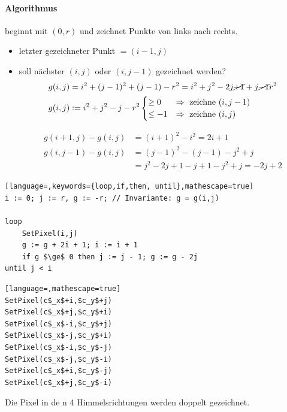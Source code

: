 \paragraph*{Algorithmus}
	beginnt mit $(0,r)$ und zeichnet Punkte von links nach rechts.
	\begin{itemize}
	 \item letzter gezeichneter Punkt $= (i-1,j)$
	 \item soll nächster $(i,j)$ oder $(i,j-1)$ gezeichnet werden?
		\begin{align*}
			g(i,j) &= i^2 + (j-1)^2 + (j-1) - r^2 = i^2 + j^2 - 2j \cancel{+ 1} + j \cancel{- 1} r^2\\
			g(i,j) &:= i^2 + j^2 - j - r^2 \begin{cases}
			                              \ge 0 &\Rightarrow\ \text{zeichne $(i, j-1)$}\\
			                              \le -1 & \Rightarrow\ \text{zeichne $(i, j)$}
			                             \end{cases}
		\end{align*}
		\begin{center}
		\end{center}
		\begin{align*}
		 g(i+1,j) - g(i,j) &= (i+1)^2 - i^2 = 2i + 1\\
		 g(i,j-1) - g(i,j) &= (j-1)^2 - (j-1) - j^2 + j\\
				   &= j^2 - 2j + 1 - j + 1 - j^2 + j = -2j + 2
		\end{align*}
		\begin{center}
		\end{center}
	\end{itemize}
	\begin{lstlisting}[language=,keywords={loop,if,then, until},mathescape=true]
i := 0; j := r, g := -r; // Invariante: g = g(i,j)

loop
	SetPixel(i,j)
	g := g + 2i + 1; i := i + 1
	if g $\ge$ 0 then j := j - 1; g := g - 2j 
until j < i
	\end{lstlisting}

	\begin{lstlisting}[language=,mathescape=true]
SetPixel(c$_x$+i,$c_y$+j)
SetPixel(c$_x$+j,$c_y$+i)
SetPixel(c$_x$-i,$c_y$+j)
SetPixel(c$_x$-j,$c_y$+i)
SetPixel(c$_x$-i,$c_y$-j)
SetPixel(c$_x$-j,$c_y$-i)
SetPixel(c$_x$+i,$c_y$-j)
SetPixel(c$_x$+j,$c_y$-i)
	\end{lstlisting}
	Die Pixel in de n 4 Himmelsrichtungen werden doppelt gezeichnet.

